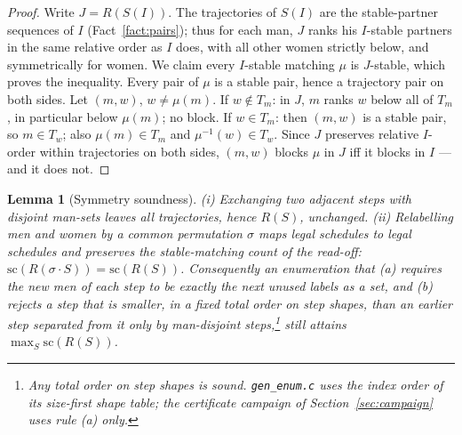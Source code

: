 \documentclass[11pt]{article}
\newtheorem{lemma}{Lemma}
\begin{document}
\begin{proof}
Write $J=R(S(I))$. The trajectories of $S(I)$ are the stable-partner sequences of $I$
(Fact~\ref{fact:pairs}); thus for each man, $J$ ranks his $I$-stable partners in the same relative
order as $I$ does, with all other women strictly below, and symmetrically for women. We claim
every $I$-stable matching $\mu$ is $J$-stable, which proves the inequality. Every pair of $\mu$ is
a stable pair, hence a trajectory pair on both sides. Let $(m,w)$, $w\ne\mu(m)$.
If $w\notin T_m$: in $J$, $m$ ranks $w$ below all of $T_m$, in particular below $\mu(m)$; no block.
If $w\in T_m$: then $(m,w)$ is a stable pair, so $m\in T_w$; also $\mu(m)\in T_m$ and
$\mu^{-1}(w)\in T_w$. Since $J$ preserves relative $I$-order within trajectories on both sides,
$(m,w)$ blocks $\mu$ in $J$ iff it blocks in $I$ --- and it does not.
\end{proof}

\begin{lemma}[Symmetry soundness]\label{lem:sym}
(i) Exchanging two adjacent steps with disjoint man-sets leaves all trajectories, hence $R(S)$,
unchanged. (ii) Relabelling men and women by a common permutation $\sigma$ maps legal schedules to
legal schedules and preserves the stable-matching count of the read-off:
$\mathrm{sc}(R(\sigma\cdot S))=\mathrm{sc}(R(S))$. Consequently an enumeration that
(a) requires the new men of each step to be exactly the next unused labels as a set, and
(b) rejects a step that is smaller, in a fixed total order on step shapes, than an earlier step
separated from it only by man-disjoint steps,\footnote{Any total order on step shapes is sound.
\texttt{gen\_enum.c} uses the index order of its size-first shape table; the certificate campaign
of Section~\ref{sec:campaign} uses rule (a) only.}
still attains $\max_S \mathrm{sc}(R(S))$.
\end{lemma}
\end{document}
